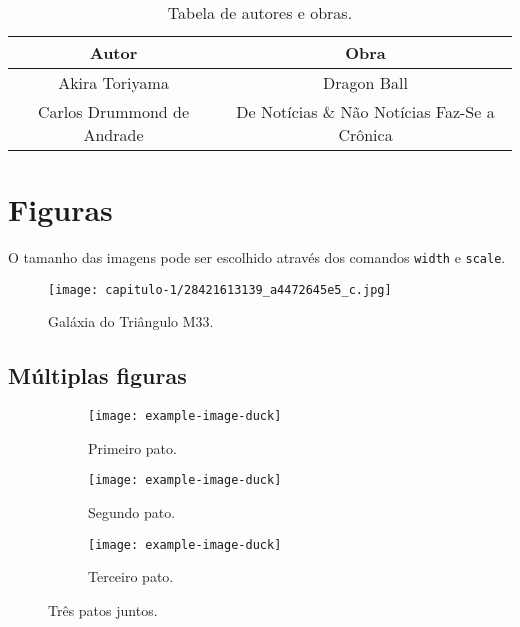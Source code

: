 \begin{table}[h]
    \centering
    \begin{tabular}{c | c}
        \hline
        Autor & Obra \\
        \hline
        Akira Toriyama & Dragon Ball \\
        Carlos Drummond de Andrade & De Notícias \& Não Notícias Faz-Se a Crônica
    \end{tabular}
    \caption[Tabela]{Tabela de autores e obras.}
    \label{table:1}
\end{table}

\section{Figuras}

O tamanho das imagens pode ser escolhido através dos comandos \verb|width| e \verb|scale|.

\begin{figure}
    \centering
    \texttt{[image: capitulo-1/28421613139\_a4472645e5\_c.jpg]}
    \caption[Galáxia M33]{Galáxia do Triângulo M33.}
\end{figure}

\subsection{Múltiplas figuras}

\begin{figure}[t]
    \centering
    \begin{subfigure}[b]{0.3\textwidth}
        \centering
        \texttt{[image: example-image-duck]}
        \caption{Primeiro pato.}
    \end{subfigure}
    \hfill
    \begin{subfigure}[b]{0.3\textwidth}
        \centering
        \texttt{[image: example-image-duck]}
        \caption{Segundo pato.}
    \end{subfigure}
    \hfill
    \begin{subfigure}[b]{0.3\textwidth}
        \centering
        \texttt{[image: example-image-duck]}
        \caption{Terceiro pato.}
    \end{subfigure}
       \caption{Três patos juntos.}
\end{figure}
